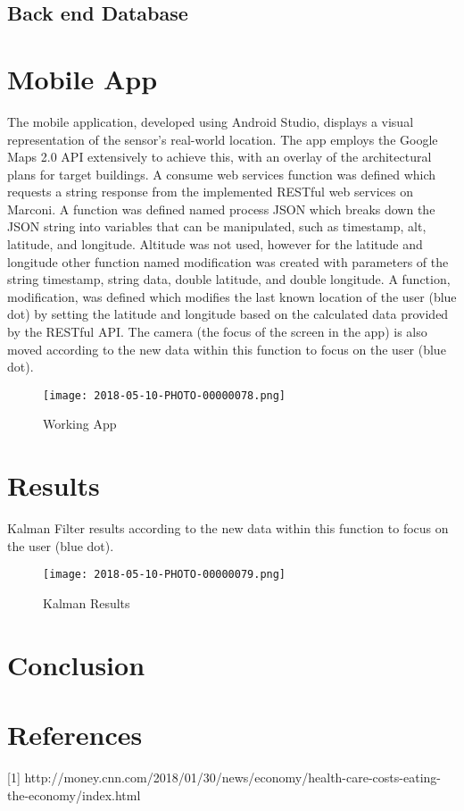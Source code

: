 \documentclass[conference]{IEEEtran}
\begin{document}
\subsection{Back end Database}


\section{Mobile App}
The mobile application, developed using Android Studio, displays a visual representation of the sensor’s real-world location. The app employs the Google Maps 2.0 API extensively to achieve this, with an overlay of the architectural plans for target buildings. A consume web services function was defined which requests a string response from the implemented RESTful web services on Marconi. A function was defined named process JSON which breaks down the JSON string into variables that can be manipulated, such as timestamp, alt, latitude, and longitude. Altitude was not used, however for the latitude and longitude other function named modification was created with parameters of the string timestamp, string data, double latitude, and double longitude. A function, modification, was defined which modifies the last known location of the user (blue dot) by setting the latitude and longitude based on the calculated data provided by the RESTful API. The camera (the focus of the screen in the app) is also moved according to the new data within this function to focus on the user (blue dot).
\begin{figure}[H]
    \texttt{[image: 2018-05-10-PHOTO-00000078.png]}
    \caption{Working App}
    \end{figure}
    \ListofFigures
\section{Results}
Kalman Filter results
according to the new data within this function to focus on the user (blue dot).
\begin{figure}[H]
    \texttt{[image: 2018-05-10-PHOTO-00000079.png]}
    \caption{Kalman Results}
    \end{figure}
    \ListofFigures
\section{Conclusion}

\section{References}
[1] http://money.cnn.com/2018/01/30/news/economy/health-care-costs-eating-the-economy/index.html
\end{document}
